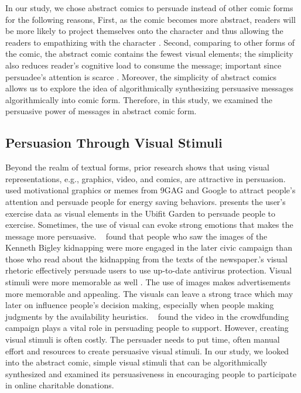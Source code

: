 In our study, we chose abstract comics to persuade instead of other comic forms for the following reasons, First, as the comic becomes more abstract, readers will be more likely to project themselves onto the character and thus allowing the readers to empathizing with the character \cite{scott1993understanding}. Second, comparing to other forms of the comic, the abstract comic contains the fewest visual elements; the simplicity also reduces reader's cognitive load to consume the message; important since persuadee's attention is scarce \cite{Janssen2016}. Moreover, the simplicity of abstract comics allows us to explore the idea of algorithmically synthesizing persuasive messages algorithmically into comic form. Therefore, in this study, we examined the persuasive power of messages in abstract comic form.

\subsection{Persuasion Through Visual Stimuli}
Beyond the realm of textual forms, prior research shows that using visual representations, e.g., graphics, video, and comics, are attractive in persuasion. \textcite{selker2015sweetbuildinggreeter} used motivational graphics or memes from 9GAG and Google to attract people's attention and persuade people for energy saving behaviors. \textcite{consolvo2008activity} presents the user's exercise data as visual elements in the Ubifit Garden to persuade people to exercise. Sometimes, the use of visual can evoke strong emotions that makes the message more persuasive. ~\textcite{iyer2006picture} found that people who saw the images of the Kenneth Bigley kidnapping were more engaged in the later civic campaign than those who read about the kidnapping from the texts of the newspaper.\textcite{zhang2014stop}'s visual rhetoric effectively persuade users to use up-to-date antivirus protection. Visual stimuli were more memorable as well \cite{nisbett1980human}. The use of images makes advertisements more memorable and appealing. The visuals can leave a strong trace which may later on influence people's decision making, especially when people making judgments by the availability heuristics. ~\textcite{dey2017art} found the video in the crowdfunding campaign plays a vital role in persuading people to support. However, creating visual stimuli is often costly. The persuader needs to put time, often manual effort and resources to create persuasive visual stimuli. In our study, we looked into the abstract comic, simple visual stimuli that can be algorithmically synthesized and examined its persuasiveness in encouraging people to participate in online charitable donations. 
